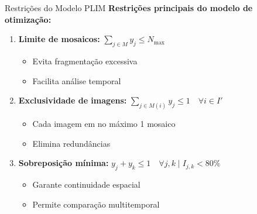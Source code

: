 \documentclass[aspectratio=169,11pt]{beamer}
\begin{document}
\begin{frame}{Restrições do Modelo PLIM}
\vspace{-0.2cm}
\textbf{Restrições principais do modelo de otimização:}

\begin{enumerate}
    \item \textbf{Limite de mosaicos:} $\sum_{j \in M} y_j \leq N_{\max}$
    \begin{itemize}
        \item Evita fragmentação excessiva
        \item Facilita análise temporal
    \end{itemize}
    
    \item \textbf{Exclusividade de imagens:} $\sum_{j \in M(i)} y_j \leq 1 \quad \forall i \in I'$
    \begin{itemize}
        \item Cada imagem em no máximo 1 mosaico
        \item Elimina redundâncias
    \end{itemize}
    
    \item \textbf{Sobreposição mínima:} $y_j + y_k \leq 1 \quad \forall j,k \mid I_{j,k} < 80\%$
    \begin{itemize}
        \item Garante continuidade espacial
        \item Permite comparação multitemporal
    \end{itemize}
\end{enumerate}
\end{frame}
\end{document}
